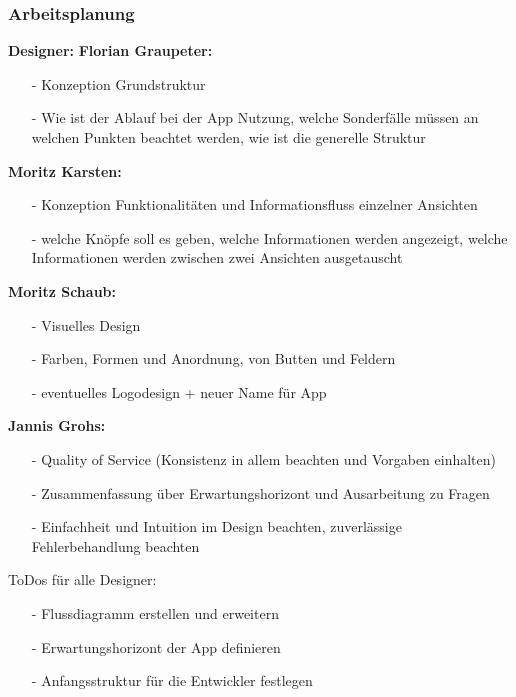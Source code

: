 \documentclass[12pt,a4paper]{article}
\begin{document}
\subsubsection{Arbeitsplanung}
\textbf{Designer:}
\textbf{Florian Graupeter:}
\begin{itemize}
\item[-]Konzeption Grundstruktur
\item[-]Wie ist der Ablauf bei der App Nutzung, welche Sonderfälle müssen an welchen Punkten beachtet werden, wie ist die generelle Struktur
\end{itemize}
\textbf{Moritz Karsten:}
\begin{itemize}
\item[-]Konzeption Funktionalitäten und Informationsfluss einzelner Ansichten
\item[-]welche Knöpfe soll es geben, welche Informationen werden angezeigt, welche Informationen werden zwischen zwei Ansichten ausgetauscht
\end{itemize}
\textbf{Moritz Schaub:}
\begin{itemize}
\item[-]Visuelles Design
\item[-]Farben, Formen und Anordnung, von Butten und Feldern 
\item[-]eventuelles Logodesign + neuer Name für App
\end{itemize}
\textbf{Jannis Grohs:}
\begin{itemize}
\item[-]Quality of Service (Konsistenz in allem beachten und Vorgaben einhalten)
\item[-]Zusammenfassung über Erwartungshorizont und Ausarbeitung zu Fragen
\item[-]Einfachheit und Intuition im Design beachten, zuverlässige Fehlerbehandlung beachten
\end{itemize}
ToDos für alle Designer:
\begin{itemize}
\item[-]Flussdiagramm erstellen und erweitern
\item[-]Erwartungshorizont der App definieren
\item[-]Anfangsstruktur für die Entwickler festlegen
\end{itemize}
\newpage
\end{document}

